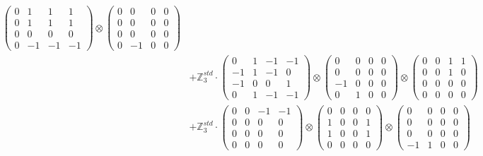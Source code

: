 \documentclass{article}
\begin{document}
{\begin{align}
            \begin{pmatrix} 0 & 1 & 1 & 1 \\ 0 & 1 & 1 & 1 \\ 0 & 0 & 0 & 0 \\ 0 & -1 & -1 & -1 \end{pmatrix} \otimes 
            \begin{pmatrix} 0 & 0 & 0 & 0 \\ 0 & 0 & 0 & 0 \\ 0 & 0 & 0 & 0 \\ 0 & -1 & 0 & 0 \end{pmatrix} \\ 
        &+ \label{Rs16-Rc11-Solution-31-c20} \mathbb{Z}_3^{std} \cdot 
            \begin{pmatrix} 0 & 1 & -1 & -1 \\ -1 & 1 & -1 & 0 \\ -1 & 0 & 0 & 1 \\ 0 & 1 & -1 & -1 \end{pmatrix} \otimes 
            \begin{pmatrix} 0 & 0 & 0 & 0 \\ 0 & 0 & 0 & 0 \\ -1 & 0 & 0 & 0 \\ 0 & 1 & 0 & 0 \end{pmatrix} \otimes 
            \begin{pmatrix} 0 & 0 & 1 & 1 \\ 0 & 0 & 1 & 0 \\ 0 & 0 & 0 & 0 \\ 0 & 0 & 0 & 0 \end{pmatrix} \\ 
        &+ \label{Rs16-Rc11-Solution-31-c21} \mathbb{Z}_3^{std} \cdot 
            \begin{pmatrix} 0 & 0 & -1 & -1 \\ 0 & 0 & 0 & 0 \\ 0 & 0 & 0 & 0 \\ 0 & 0 & 0 & 0 \end{pmatrix} \otimes 
            \begin{pmatrix} 0 & 0 & 0 & 0 \\ 1 & 0 & 0 & 1 \\ 1 & 0 & 0 & 1 \\ 0 & 0 & 0 & 0 \end{pmatrix} \otimes 
            \begin{pmatrix} 0 & 0 & 0 & 0 \\ 0 & 0 & 0 & 0 \\ 0 & 0 & 0 & 0 \\ -1 & 1 & 0 & 0 \end{pmatrix} \\ 

\end{align}}
\end{document}
